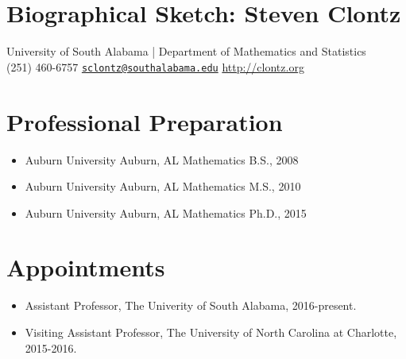 \documentclass[11pt,letterpaper]{article}
\newcommand{\required}[1]{\section*{\LARGE\hfil #1\hfil}}                    %
\begin{document}

\setcounter{section}{0}
\required{Biographical Sketch: Steven Clontz}

\begin{center}

  University of South Alabama |
  Department of Mathematics and Statistics \\
  (251) 460-6757 \hspace{2em}
    \href{mailto:sclontz@southalabama.edu}{\nolinkurl{sclontz@southalabama.edu}}
    \hspace{2em}
    \url{http://clontz.org}
\end{center}


\section{Professional Preparation}

\begin{itemize}{}
  \item Auburn University \hspace{3em} Auburn, AL \hspace{3em} Mathematics \hspace{3em} B.S., 2008
  \item Auburn University \hspace{3em} Auburn, AL \hspace{3em} Mathematics \hspace{3em} M.S., 2010
  \item Auburn University \hspace{3em} Auburn, AL \hspace{3em} Mathematics \hspace{3em} Ph.D., 2015
\end{itemize}



\section{Appointments}

\begin{itemize}
  \item Assistant Professor, The Univerity of South Alabama, 2016-present.
  \item Visiting Assistant Professor, The University of North Carolina at
        Charlotte, 2015-2016.
\end{itemize}
\end{document}
